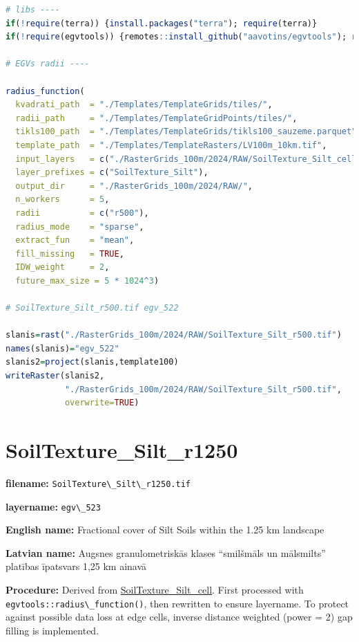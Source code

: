 \documentclass[
]{book}
\newcommand{\passthrough}[1]{#1}
\begin{document}
\begin{lstlisting}[language=R]
# libs ----
if(!require(terra)) {install.packages("terra"); require(terra)}
if(!require(egvtools)) {remotes::install_github("aavotins/egvtools"); require(egvtools)}

# EGVs radii ----

radius_function(
  kvadrati_path  = "./Templates/TemplateGrids/tiles/",
  radii_path     = "./Templates/TemplateGridPoints/tiles/",
  tikls100_path  = "./Templates/TemplateGrids/tikls100_sauzeme.parquet",
  template_path  = "./Templates/TemplateRasters/LV100m_10km.tif",
  input_layers   = c("./RasterGrids_100m/2024/RAW/SoilTexture_Silt_cell.tif"),
  layer_prefixes = c("SoilTexture_Silt"),
  output_dir     = "./RasterGrids_100m/2024/RAW/",
  n_workers      = 5,
  radii          = c("r500"),
  radius_mode    = "sparse",
  extract_fun    = "mean",
  fill_missing   = TRUE,
  IDW_weight     = 2,
  future_max_size = 5 * 1024^3)

# SoilTexture_Silt_r500.tif egv_522

slanis=rast("./RasterGrids_100m/2024/RAW/SoilTexture_Silt_r500.tif")
names(slanis)="egv_522"
slanis2=project(slanis,template100)
writeRaster(slanis2,
            "./RasterGrids_100m/2024/RAW/SoilTexture_Silt_r500.tif",
            overwrite=TRUE)
\end{lstlisting}

\section{SoilTexture\_Silt\_r1250}\label{ch06.523}

\textbf{filename:} \passthrough{\lstinline!SoilTexture\_Silt\_r1250.tif!}

\textbf{layername:} \passthrough{\lstinline!egv\_523!}

\textbf{English name:} Fractional cover of Silt Soils within the 1.25 km landscape

\textbf{Latvian name:} Augsnes granulometriskās klases ``smilšmāls un mālsmilts'' platības īpatsvars 1,25 km ainavā

\textbf{Procedure:} Derived from \hyperref[ch06.521]{SoilTexture\_Silt\_cell}. First processed
with \passthrough{\lstinline!egvtools::radius\_function()!}, then rewritten to ensure layername. To protect against
possible data loss at edge cells, inverse distance weighted (power = 2) gap filling
is implemented.
\end{document}
